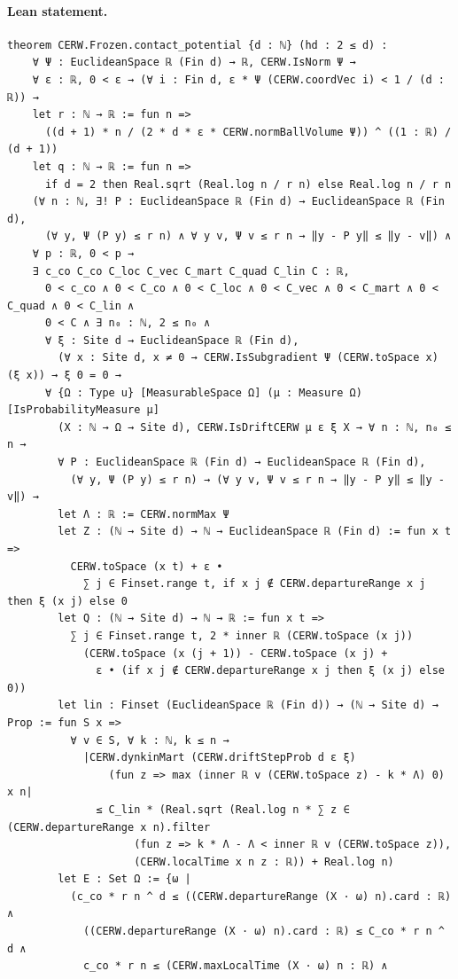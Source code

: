 \paragraph{Lean statement.}
\begin{verbatim}
theorem CERW.Frozen.contact_potential {d : ℕ} (hd : 2 ≤ d) :
    ∀ Ψ : EuclideanSpace ℝ (Fin d) → ℝ, CERW.IsNorm Ψ →
    ∀ ε : ℝ, 0 < ε → (∀ i : Fin d, ε * Ψ (CERW.coordVec i) < 1 / (d : ℝ)) →
    let r : ℕ → ℝ := fun n =>
      ((d + 1) * n / (2 * d * ε * CERW.normBallVolume Ψ)) ^ ((1 : ℝ) / (d + 1))
    let q : ℕ → ℝ := fun n =>
      if d = 2 then Real.sqrt (Real.log n / r n) else Real.log n / r n
    (∀ n : ℕ, ∃! P : EuclideanSpace ℝ (Fin d) → EuclideanSpace ℝ (Fin d),
      (∀ y, Ψ (P y) ≤ r n) ∧ ∀ y v, Ψ v ≤ r n → ‖y - P y‖ ≤ ‖y - v‖) ∧
    ∀ p : ℝ, 0 < p →
    ∃ c_co C_co C_loc C_vec C_mart C_quad C_lin C : ℝ,
      0 < c_co ∧ 0 < C_co ∧ 0 < C_loc ∧ 0 < C_vec ∧ 0 < C_mart ∧ 0 < C_quad ∧ 0 < C_lin ∧
      0 < C ∧ ∃ n₀ : ℕ, 2 ≤ n₀ ∧
      ∀ ξ : Site d → EuclideanSpace ℝ (Fin d),
        (∀ x : Site d, x ≠ 0 → CERW.IsSubgradient Ψ (CERW.toSpace x) (ξ x)) → ξ 0 = 0 →
      ∀ {Ω : Type u} [MeasurableSpace Ω] (μ : Measure Ω) [IsProbabilityMeasure μ]
        (X : ℕ → Ω → Site d), CERW.IsDriftCERW μ ε ξ X → ∀ n : ℕ, n₀ ≤ n →
        ∀ P : EuclideanSpace ℝ (Fin d) → EuclideanSpace ℝ (Fin d),
          (∀ y, Ψ (P y) ≤ r n) → (∀ y v, Ψ v ≤ r n → ‖y - P y‖ ≤ ‖y - v‖) →
        let Λ : ℝ := CERW.normMax Ψ
        let Z : (ℕ → Site d) → ℕ → EuclideanSpace ℝ (Fin d) := fun x t =>
          CERW.toSpace (x t) + ε •
            ∑ j ∈ Finset.range t, if x j ∉ CERW.departureRange x j then ξ (x j) else 0
        let Q : (ℕ → Site d) → ℕ → ℝ := fun x t =>
          ∑ j ∈ Finset.range t, 2 * inner ℝ (CERW.toSpace (x j))
            (CERW.toSpace (x (j + 1)) - CERW.toSpace (x j) +
              ε • (if x j ∉ CERW.departureRange x j then ξ (x j) else 0))
        let lin : Finset (EuclideanSpace ℝ (Fin d)) → (ℕ → Site d) → Prop := fun S x =>
          ∀ v ∈ S, ∀ k : ℕ, k ≤ n →
            |CERW.dynkinMart (CERW.driftStepProb d ε ξ)
                (fun z => max (inner ℝ v (CERW.toSpace z) - k * Λ) 0) x n|
              ≤ C_lin * (Real.sqrt (Real.log n * ∑ z ∈ (CERW.departureRange x n).filter
                    (fun z => k * Λ - Λ < inner ℝ v (CERW.toSpace z)),
                    (CERW.localTime x n z : ℝ)) + Real.log n)
        let E : Set Ω := {ω |
          (c_co * r n ^ d ≤ ((CERW.departureRange (X · ω) n).card : ℝ) ∧
            ((CERW.departureRange (X · ω) n).card : ℝ) ≤ C_co * r n ^ d ∧
            c_co * r n ≤ (CERW.maxLocalTime (X · ω) n : ℝ) ∧

\end{verbatim}
